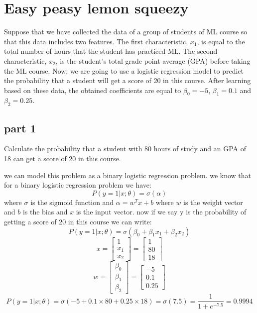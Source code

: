 \section{Easy peasy lemon squeezy}
Suppose that we have collected the data of a group of students of ML course so that this data includes two features. The first characteristic, $x_1$, is equal to the total number of hours that the student has practiced ML. The second characteristic, $x_2$, is the student's total grade point average (GPA) before taking the ML course. Now, we are going to use a logistic regression model to predict the probability that a student will get a score of 20 in this course. After learning based on these data, the obtained coefficients are equal to $\beta_0 = -5$, $\beta_1 = 0.1$ and $\beta_2 = 0.25$.
\subsection{part 1}
Calculate the probability that a student with 80 hours of study and an GPA of 18 can get a score of 20 in this course.
\begin{qsolve}
    \begin{qsolve}[]
        we can model this problem as a binary logistic regression problem. we know that for a binary logistic regression problem we have:
            $$P(y=1|x;\theta) = \sigma (\alpha )$$
        where $\sigma$ is the sigmoid function and $\alpha = w^T x +b$ where $w$ is the weight vector and $b$ is the bias and $x$ is the input vector. now if we say y is the probability of getting a score of 20 in this course we can write:
            $$P(y=1|x;\theta) = \sigma (\beta_0 + \beta_1 x_1 + \beta_2 x_2)$$
            $$x = \begin{bmatrix} 1 \\ x_1 \\ x_2 \end{bmatrix} = \begin{bmatrix} 1 \\ 80 \\ 18 \end{bmatrix}$$
            $$w = \begin{bmatrix} \beta_0 \\ \beta_1 \\ \beta_2 \end{bmatrix} = \begin{bmatrix} -5 \\ 0.1 \\ 0.25 \end{bmatrix}$$
            $$P(y=1|x;\theta) = \sigma (-5 + 0.1 \times 80 + 0.25 \times 18) = \sigma(7.5) = \frac{1}{1+e^{-7.5}} = 0.9994$$
    \end{qsolve}
\end{qsolve}
